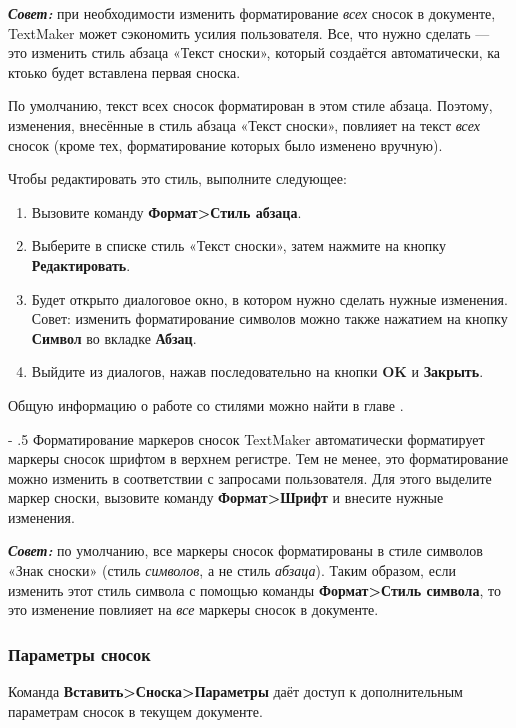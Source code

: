 ﻿\documentclass[a4paper,10pt]{article}
\makeatletter
\renewcommand\paragraph{%
   \@startsection{paragraph}{4}{0mm}%
      {-\baselineskip}%
      {.5\baselineskip}%
      {\normalfont\normalsize\bfseries}}
\makeatother
\begin{document}
\textbf{\textit{Совет:}} при необходимости изменить форматирование \textit{всех} сносок в документе, TextMaker может сэкономить усилия пользователя. Все, что нужно сделать — это изменить стиль абзаца «Текст сноски», который создаётся автоматически, ка ктоько будет вставлена первая сноска.

По умолчанию, текст всех сносок форматирован в этом стиле абзаца. Поэтому, изменения, внесённые в стиль абзаца «Текст сноски», повлияет на текст \textit{всех} сносок (кроме тех, форматирование которых было изменено вручную).

Чтобы редактировать это стиль, выполните следующее:

\begin{enumerate}
 \item Вызовите команду \textbf{Формат>Стиль абзаца}.
 \item Выберите в списке стиль «Текст сноски», затем нажмите на кнопку \textbf{Редактировать}.
 \item Будет открыто диалоговое окно, в котором нужно сделать нужные изменения. Совет: изменить форматирование символов можно также нажатием на кнопку \textbf{Символ} во вкладке \textbf{Абзац}.
 \item Выйдите из диалогов, нажав последовательно на кнопки \textbf{OK} и \textbf{Закрыть}.
\end{enumerate}

Общую информацию о работе со стилями можно найти в главе .

\paragraph{Форматирование маркеров сносок}
TextMaker автоматически форматирует маркеры сносок шрифтом в верхнем регистре. Тем не менее, это форматирование можно изменить в соответствии с запросами пользователя. Для этого выделите маркер сноски, вызовите команду \textbf{Формат>Шрифт} и внесите нужные изменения.

\textit{\textbf{Совет:}} по умолчанию, все маркеры сносок форматированы в стиле символов «Знак сноски» (стиль \textit{символов}, а не стиль \textit{абзаца}). Таким образом, если изменить этот стиль символа с помощью команды \textbf{Формат>Стиль символа}, то это изменение повлияет на \textit{все} маркеры сносок в документе.

\subsubsection{Параметры сносок}
Команда \textbf{Вставить>Сноска>Параметры} даёт доступ к дополнительным параметрам сносок в текущем документе.
\end{document}
